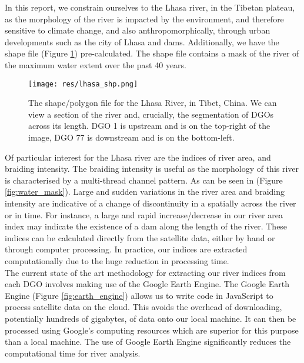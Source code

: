 \documentclass[12pt]{article}
\begin{document}
In this report, we constrain ourselves to the Lhasa river, in the Tibetan plateau, as the morphology of the river is impacted by the environment, and therefore sensitive to climate change, and also anthropomorphically, through urban developments such as the city of Lhasa and dams. Additionally, we have the shape file (Figure \ref{fig:lhasa_shp}) pre-calculated. The shape file contains a mask of the river of the maximum water extent over the past 40 years.\cite{pekel} \\



\begin{figure}[H]
    \centering
    \texttt{[image: res/lhasa\_shp.png]}
    \caption{The shape/polygon file for the Lhasa River, in Tibet, China. We can view a section of the river and, crucially, the segmentation of DGOs across its length. DGO 1 is upstream and is on the top-right of the image, DGO 77 is downstream and is on the bottom-left.}
    \label{fig:lhasa_shp}
\end{figure}

Of particular interest for the Lhasa river are the indices of river area, and braiding intensity\cite{braiding-intensity}. The braiding intensity is useful as the morphology of this river is characterised by a multi-thread channel pattern. As can be seen in (Figure \ref{fig:water_mask}). Large and sudden variations in the river area and braiding intensity are indicative of a change of discontinuity in a spatially across the river or in time. For instance, a large and rapid increase/decrease in our river area index may indicate the existence of a dam along the length of the river. These indices can be calculated directly from the satellite data, either by hand or through computer processing. In practice, our indices are extracted computationally due to the huge reduction in processing time. \\

The current state of the art methodology for extracting our river indices from each DGO involves making use of the Google Earth Engine\cite{google-earth-engine}. The Google Earth Engine (Figure \ref{fig:earth_engine}) allows us to write code in JavaScript to process satellite data on the cloud. This avoids the overhead of downloading, potentially hundreds of gigabytes, of data onto our local machine. It can then be processed using Google's computing resources which are superior for this purpose than a local machine. The use of Google Earth Engine significantly reduces the computational time for river analysis. \\
\end{document}
